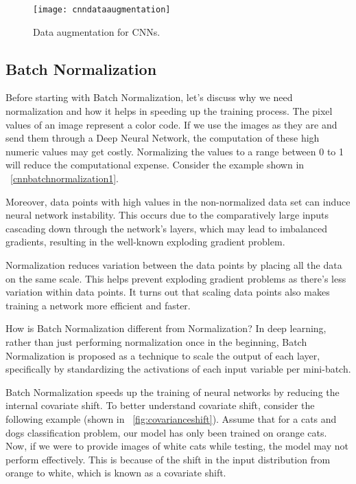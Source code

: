 	\begin{figure}[tbh]
		\centering
		\texttt{[image: cnndataaugmentation]}
		\caption[Data augmentation for CNNs]{Data augmentation for CNNs.}
		\label{fig:cnndataaugmentation}
	\end{figure}

	\subsection{Batch Normalization}
	\begin{bulletedlist}
		\item Before starting with Batch Normalization, let's discuss why we need normalization and how it helps in speeding up the training process.  The pixel values of an image represent a color code. If we use the images as they are and send them through a Deep Neural Network, the computation of these high numeric values may get costly. Normalizing the values to a range between 0 to 1 will reduce the computational expense.  Consider the example shown in \figurename~\ref{cnnbatchnormalization1}.
		\item Moreover, data points with high values in the non-normalized data set can induce neural network instability. This occurs due to the comparatively large inputs cascading down through the network's layers, which may lead to imbalanced gradients, resulting in the well-known exploding gradient problem.
		\item Normalization reduces variation between the data points by placing all the data on the same scale. This helps prevent exploding gradient problems as there's less variation within data points.  It turns out that scaling data points also makes training a network more efficient and faster.
		\item How is Batch Normalization different from Normalization?  In deep learning, rather than just performing normalization once in the beginning, Batch Normalization is proposed as a technique to scale the output of each layer, specifically by standardizing the activations of each input variable per mini-batch.
		\item Batch Normalization speeds up the training of neural networks by reducing the internal covariate shift.  To better understand covariate shift, consider the following example (shown in \figurename~\ref{fig:covarianceshift}).  Assume that for a cats and dogs classification problem, our model has only been trained on orange cats.  Now, if we were to provide images of white cats while testing, the model may not perform effectively.  This is because of the shift in the input distribution from orange to white, which is known as a covariate shift.

\end{bulletedlist}
